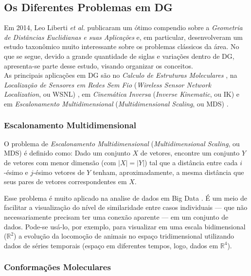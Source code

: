 \subsection*{Os Diferentes Problemas em DG}

Em 2014, Leo Liberti \textit{et al.} publicaram um ótimo compendio sobre a \textit{Geometria de Distâncias Euclidianas e suas Aplicações} e, em particular, desenvolveram um estudo  taxonômico muito interessante sobre os problemas clássicos da área. No que se segue, devido a grande quantidade de siglas e variações dentro de DG, apresenta-se parte desse estudo, visando organizar os conceitos. 
\\

As principais aplicações em DG são no \textit{Calculo de Estruturas Moleculares} \cite{crippen:DistancesAndMolecularConformation}, na \textit{Localização de Sensores em Redes Sem Fio} (\textit{Wireless Sensor Network Localization}, ou WSNL) \cite{yemini1978positioning}, em \textit{Cinemática Inversa} (\textit{Inverse Kinematic}, ou IK) \cite{cinematicaInversa} e em \textit{Escalonamento Multidimensional} (\textit{Multidimensional Scaling}, ou MDS) \cite{multidimensionalScaling}.

\subsubsection{Escalonamento Multidimensional}

O problema de \textit{Escalonamento Multidimensional} (\textit{Multidimensional Scaling}, ou MDS)
é definido como: Dado um conjunto $X$ de vetores, encontre um conjunto $Y$ de vetores com menor dimensão (com $|X| = |Y|$) tal que a distância entre cada $i$-ésimo e $j$-ésimo vetores de $Y$ tenham, aproximadamente, a mesma distância que seus pares de vetores correspondentes em $X$.

Esse problema é muito aplicado na analise de dados em Big Data \cite{libertiEDG}. É um meio de facilitar a visualização do nível de similaridade entre casos individuais --- que não necessariamente precisam ter uma conexão aparente --- em um conjunto de dados. Pode-se usá-lo, por exemplo, para visualizar em uma escala bidimensional ($\mathbb{R}^2$) a evolução da locomoção de animais no espaço tridimensional utilizando dados de séries temporais (espaço em diferentes tempos, logo, dados em $\mathbb{R}^4$).

\subsubsection{Conformações Moleculares}

